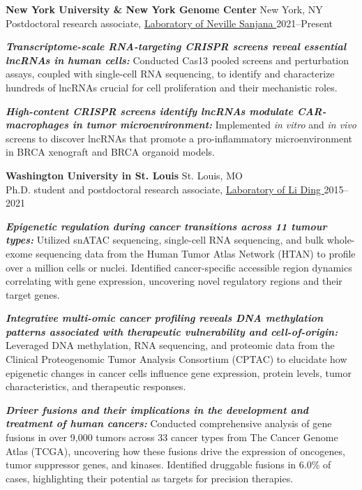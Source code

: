 \documentclass[letterpaper,11pt]{cv}
\begin{document}
\begin{entrylist}
\raggedleft
\item \textbf{New York University \& New York Genome Center} \hfill New York, NY\\
Postdoctoral research associate, \href{http://sanjanalab.org/}{Laboratory of Neville Sanjana } \hfill
2021--Present
\begin{detaillist}
    \item \textit{\textbf{Transcriptome-scale RNA-targeting CRISPR screens reveal essential lncRNAs in human cells:}} Conducted Cas13 pooled screens and perturbation assays, coupled with single-cell RNA sequencing, to identify and characterize hundreds of lncRNAs crucial for cell proliferation and their mechanistic roles.
    \item \textit{\textbf{High-content CRISPR screens identify lncRNAs modulate CAR-macrophages in tumor microenvironment:}} Implemented \textit{in vitro} and \textit{in vivo} screens to discover lncRNAs that promote a pro-inflammatory microenvironment in BRCA xenograft and BRCA organoid models. 
\end{detaillist}

\item \textbf{Washington University in St. Louis} \hfill St. Louis, MO\\
Ph.D. student and postdoctoral research associate, \href{https://dinglab.wustl.edu/}{Laboratory of Li Ding } \hfill
2015--2021
\begin{detaillist}
    \item \textit{\textbf{Epigenetic regulation during cancer transitions across 11 tumour types:}} Utilized snATAC sequencing, single-cell RNA sequencing, and bulk whole-exome sequencing data from the Human Tumor Atlas Network (HTAN) to profile over a million cells or nuclei. Identified cancer-specific accessible region dynamics correlating with gene expression, uncovering novel regulatory regions and their target genes.
    \item \textit{\textbf{Integrative multi-omic cancer profiling reveals DNA methylation patterns associated with therapeutic vulnerability and cell-of-origin:}} Leveraged DNA methylation, RNA sequencing, and proteomic data from the Clinical Proteogenomic Tumor Analysis Consortium (CPTAC) to elucidate how epigenetic changes in cancer cells influence gene expression, protein levels, tumor characteristics, and therapeutic responses.
    \item \textit{\textbf{Driver fusions and their implications in the development and treatment of human cancers:}} Conducted comprehensive analysis of gene fusions in over 9,000 tumors across 33 cancer types from The Cancer Genome Atlas (TCGA), uncovering how these fusions drive the expression of oncogenes, tumor suppressor genes, and kinases. Identified druggable fusions in 6.0\% of cases, highlighting their potential as targets for precision therapies.
\end{detaillist}


\end{entrylist}
\end{document}
